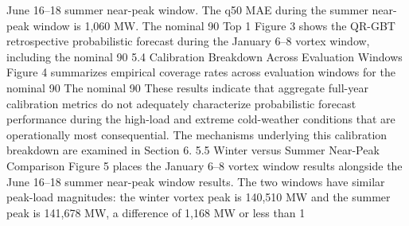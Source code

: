 June 16–18 summer near-peak window. The q50 MAE during the summer near-peak window is 1,060 MW. The nominal 90%
Top 1%
Figure 3 shows the QR-GBT retrospective probabilistic forecast during the January 6–8 vortex window, including the nominal 90%
5.4 Calibration Breakdown Across Evaluation Windows
Figure 4 summarizes empirical coverage rates across evaluation windows for the nominal 90%
The nominal 90%
These results indicate that aggregate full-year calibration metrics do not adequately characterize probabilistic forecast performance during the high-load and extreme cold-weather conditions that are operationally most consequential. The mechanisms underlying this calibration breakdown are examined in Section 6.
5.5 Winter versus Summer Near-Peak Comparison
Figure 5 places the January 6–8 vortex window results alongside the June 16–18 summer near-peak window results. The two windows have similar peak-load magnitudes: the winter vortex peak is 140,510 MW and the summer peak is 141,678 MW, a difference of 1,168 MW or less than 1%
